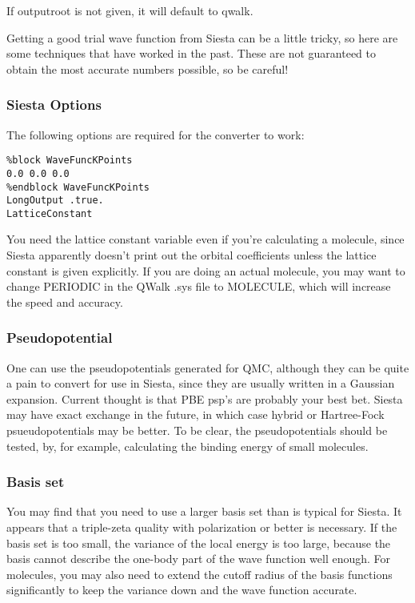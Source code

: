 \documentclass[12pt]{article}
\begin{document}
If outputroot is not given, it will default to qwalk.

Getting a good trial wave function from Siesta can be a little
tricky, so here are some techniques that have worked in the past.
These are not guaranteed to obtain the most accurate numbers possible,
so be careful!

\subsubsection{Siesta Options}

The following options are required for the converter to work:
\begin{verbatim}
%block WaveFuncKPoints
0.0 0.0 0.0
%endblock WaveFuncKPoints
LongOutput .true.
LatticeConstant 
\end{verbatim}

You need the lattice constant variable even if you're calculating
a molecule, since Siesta apparently doesn't print out the orbital
coefficients unless the lattice constant is given explicitly.  If you
are doing an actual molecule, you may want to change PERIODIC in the
QWalk .sys file to MOLECULE, which will increase the speed and accuracy.

\subsubsection{Pseudopotential}

One can use the pseudopotentials generated for QMC, although they can be
quite a pain to convert for use in Siesta, since they are usually
written in a Gaussian expansion.  Current thought is that PBE psp's are
probably your best bet.  Siesta
may have exact exchange in the future, in which case hybrid or
Hartree-Fock psueudopotentials may be better.  To be clear, the
pseudopotentials should be tested, by, for example, calculating
the binding energy of small molecules.


\subsubsection{Basis set}

You may find that you need to use a larger basis set than is typical for
Siesta.  It appears that a triple-zeta quality with polarization or better
is necessary.  If the basis set is too small, the variance of the local
energy is too large, because the basis cannot describe the one-body
part of the wave function well enough.  For molecules, you may also
need to extend the cutoff radius of the basis functions significantly to
keep the variance down and the wave function accurate.
\end{document}
